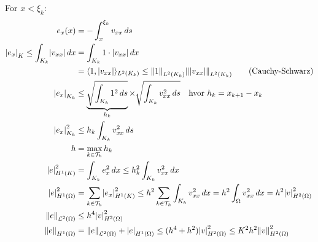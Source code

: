 For $x < \xi_k$:
\begin{align*}
	e_x(x)                                           & =-\int_{x}^{\xi_k} v_{xx} \, ds                                                                                                                                                \\
	\abs*{e_x}_K \leq \int_{K_k} \abs*{v_{xx}} \, dx & = \int_{K_k} 1\cdot \abs*{v_{xx}} \, dx                                                                                                                                        \\
	                                                 & = \inner{1, \abs*{v_{xx}}}_{L^2(K_k)} \leq \norm*{1}_{L^2(K_k)} \norm*{\abs*{v_{xx}}}_{L^2(K_k)} \tag{Cauchy-Schwarz}                                                          \\
	\abs*{e_x}_{K_k}                                 & \leq \underbrace{\sqrt{\int_{K_k} 1^2 \, ds}}_{h_k} \times \sqrt{\int_{K_k} v_{xx}^2 \, ds} \quad \text{hvor } h_k = x_{k+1} - x_k                                             \\
	\abs*{e_x}_{K_k}^2                               & \leq h_k \int_{K_k} v_{xx}^2 \, ds                                                                                                                                             \\
	h                                                & = \max_{k \in \mathcal{T}_h} h_k                                                                                                                                               \\
	\abs*{e}_{H^1(K)}^2                              & = \int_{K_k} e_x^2 \, dx \leq h_k^2 \int_{K_k} v_{xx}^2 \, dx                                                                                                                  \\
	\abs*{e}_{H^1(\Omega)}^2                         & = \sum_{k\in\mathcal{T}_h} \abs*{e_x}_{H^1(K)}^2 \leq h^2 \sum_{k\in\mathcal{T}_h} \int_{K_k} v_{xx}^2 \, dx = h^2 \int_{\Omega} v_{xx}^2 \, dx = h^2 \abs*{v}_{H^2(\Omega)}^2 \\
	\norm*{e}_{\Lcal^2(\Omega)}                      & \leq h^4 \abs*{v}_{H^2(\Omega)}^2                                                                                                                                              \\
	\norm*{e}_{H^1(\Omega)}                          & = \norm*{e}_{\Lcal^2(\Omega)} + \abs*{e}_{H^1(\Omega)} \leq (h^4 + h^2) \abs*{v}_{H^2(\Omega)}^2 \leq K^2 h^2 \norm*{v}_{H^2(\Omega)}^2                                        \\
\end{align*}

